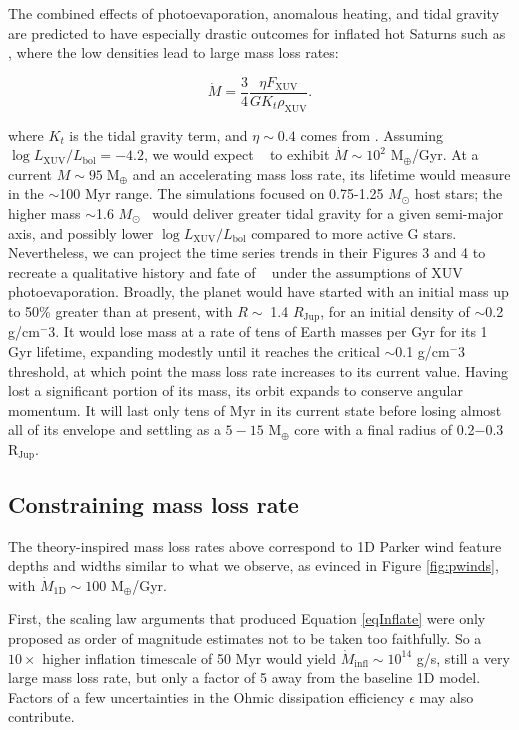 \documentclass[twocolumn]{aastex631}
\newcommand{\hatp}{\object{HAT-P-67}~}
\newcommand{\hatpb}{\object{HAT-P-67 b}}
\begin{document}
The combined effects of photoevaporation, anomalous heating, and tidal gravity are predicted to have especially drastic outcomes for inflated hot Saturns \citep{2023ApJ...945L..36T} such as \hatpb, where the low densities lead to large mass loss rates:

\begin{equation}
    \dot{M} = \frac{3}{4}\frac{\eta F_\mathrm{XUV}}{G K_t \rho_\mathrm{XUV}}\label{thorn23Mdot}.
\end{equation}

\noindent where $K_t$ is the tidal gravity term, and $\eta \sim 0.4$ comes from \citet{2022A&A...663A.122C}.  Assuming $\log{L_\mathrm{XUV}/L_\mathrm{bol}}=-4.2$, we would expect \hatpb~ to exhibit $\dot{M}\sim10^2$ M$_\oplus$/Gyr. At a current $M\sim95\;$M$_\oplus$ and an accelerating mass loss rate, its lifetime would measure in the $\sim$100 Myr range.  The \citet{2023ApJ...945L..36T} simulations focused on 0.75-1.25 $M_\odot$ host stars; the higher mass $\sim$1.6 $M_\odot$ \hatp would deliver greater tidal gravity for a given semi-major axis, and possibly lower $\log{L_\mathrm{XUV}/L_\mathrm{bol}}$ compared to more active G stars.  Nevertheless, we can project the time series trends in their Figures 3 and 4 to recreate a qualitative history and fate of \hatpb~ under the assumptions of XUV photoevaporation.  Broadly, the planet would have started with an initial mass up to 50$\%$ greater than at present, with $R\sim\;$1.4 $R_\mathrm{Jup}$, for an initial density of $\sim$0.2 g/cm$^-3$.  It would lose mass at a rate of tens of Earth masses per Gyr for its 1 Gyr lifetime, expanding modestly until it reaches the critical $\sim$0.1 g/cm$^-3$ threshold, at which point the mass loss rate increases to its current value.  Having lost a significant portion of its mass, its orbit expands to conserve angular momentum.  It will last only tens of Myr in its current state before losing almost all of its envelope and settling as a $5-15$ M$_\oplus$ core with a final radius of 0.2$-$0.3 R$_\mathrm{Jup}$.


\subsection{Constraining mass loss rate}
The theory-inspired mass loss rates above correspond to 1D Parker wind  feature depths and widths similar to what we observe, as evinced in Figure \ref{fig:pwinds}, with $\dot{M}_\mathrm{1D}\sim100$ M$_\oplus$/Gyr.

First, the scaling law arguments that produced Equation \ref{eqInflate} were only proposed as order of magnitude estimates not to be taken too faithfully.  So a $10\times$ higher inflation timescale of 50 Myr would yield $\dot{M}_\mathrm{infl}\sim10^{14}$ g/s, still a very large mass loss rate, but only a factor of 5 away from the baseline 1D model.  Factors of a few uncertainties in the Ohmic dissipation efficiency $\epsilon$ may also contribute.
\end{document}
